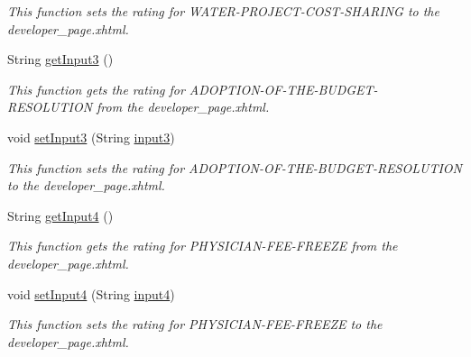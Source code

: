 \begin{DoxyCompactItemize}
\begin{DoxyCompactList}\small\item\em This function sets the rating for W\+A\+T\+E\+R-\/\+P\+R\+O\+J\+E\+C\+T-\/\+C\+O\+S\+T-\/\+S\+H\+A\+R\+I\+NG to the developer\+\_\+page.\+xhtml. \end{DoxyCompactList}\item 
String \hyperlink{classorg_1_1jboss_1_1as_1_1quickstarts_1_1greeter_1_1web_1_1_general_controller_a07ef67b84dcffcd0c67c2f1066864cd7}{get\+Input3} ()
\begin{DoxyCompactList}\small\item\em This function gets the rating for A\+D\+O\+P\+T\+I\+O\+N-\/\+O\+F-\/\+T\+H\+E-\/\+B\+U\+D\+G\+E\+T-\/\+R\+E\+S\+O\+L\+U\+T\+I\+ON from the developer\+\_\+page.\+xhtml. \end{DoxyCompactList}\item 
void \hyperlink{classorg_1_1jboss_1_1as_1_1quickstarts_1_1greeter_1_1web_1_1_general_controller_aa39f05799adbcb0152d6e5abd422d57c}{set\+Input3} (String \hyperlink{classorg_1_1jboss_1_1as_1_1quickstarts_1_1greeter_1_1web_1_1_general_controller_a36a500a251dadf666aad0bd8a48e4e56}{input3})
\begin{DoxyCompactList}\small\item\em This function sets the rating for A\+D\+O\+P\+T\+I\+O\+N-\/\+O\+F-\/\+T\+H\+E-\/\+B\+U\+D\+G\+E\+T-\/\+R\+E\+S\+O\+L\+U\+T\+I\+ON to the developer\+\_\+page.\+xhtml. \end{DoxyCompactList}\item 
String \hyperlink{classorg_1_1jboss_1_1as_1_1quickstarts_1_1greeter_1_1web_1_1_general_controller_ae602c15cd15d5cc12f9dc97bfb96bad4}{get\+Input4} ()
\begin{DoxyCompactList}\small\item\em This function gets the rating for P\+H\+Y\+S\+I\+C\+I\+A\+N-\/\+F\+E\+E-\/\+F\+R\+E\+E\+ZE from the developer\+\_\+page.\+xhtml. \end{DoxyCompactList}\item 
void \hyperlink{classorg_1_1jboss_1_1as_1_1quickstarts_1_1greeter_1_1web_1_1_general_controller_a0ed7c976621f3588a5f082d1d5287c9f}{set\+Input4} (String \hyperlink{classorg_1_1jboss_1_1as_1_1quickstarts_1_1greeter_1_1web_1_1_general_controller_a3701e9dd2f947f2175387f2fbe7f67eb}{input4})
\begin{DoxyCompactList}\small\item\em This function sets the rating for P\+H\+Y\+S\+I\+C\+I\+A\+N-\/\+F\+E\+E-\/\+F\+R\+E\+E\+ZE to the developer\+\_\+page.\+xhtml. \end{DoxyCompactList}\item 

\end{DoxyCompactItemize}
